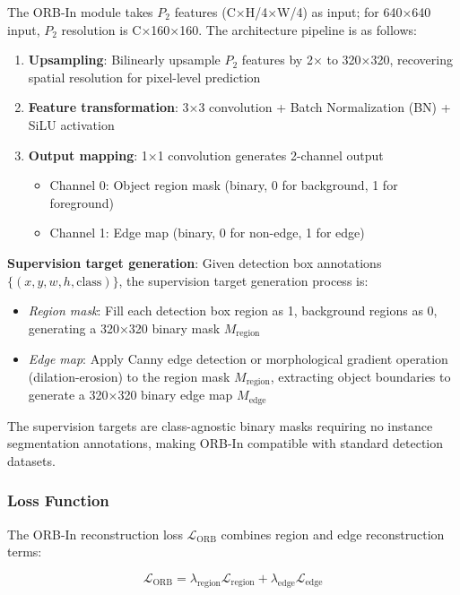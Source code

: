 \documentclass[journal]{IEEEtran}
\begin{document}
The ORB-In module takes $P_2$ features (C×H/4×W/4) as input; for 640×640 input, $P_2$ resolution is C×160×160. The architecture pipeline is as follows:

\begin{enumerate}
    \item \textbf{Upsampling}: Bilinearly upsample $P_2$ features by 2× to 320×320, recovering spatial resolution for pixel-level prediction
    \item \textbf{Feature transformation}: 3×3 convolution + Batch Normalization (BN) + SiLU activation
    \item \textbf{Output mapping}: 1×1 convolution generates 2-channel output
    \begin{itemize}
        \item Channel 0: Object region mask (binary, 0 for background, 1 for foreground)
        \item Channel 1: Edge map (binary, 0 for non-edge, 1 for edge)
    \end{itemize}
\end{enumerate}

\textbf{Supervision target generation}: Given detection box annotations $\{(x, y, w, h, \text{class})\}$, the supervision target generation process is:
\begin{itemize}
    \item \textit{Region mask}: Fill each detection box region as 1, background regions as 0, generating a 320×320 binary mask $M_{\text{region}}$
    \item \textit{Edge map}: Apply Canny edge detection or morphological gradient operation (dilation-erosion) to the region mask $M_{\text{region}}$, extracting object boundaries to generate a 320×320 binary edge map $M_{\text{edge}}$
\end{itemize}

The supervision targets are class-agnostic binary masks requiring no instance segmentation annotations, making ORB-In compatible with standard detection datasets.

\subsubsection{Loss Function}

The ORB-In reconstruction loss $\mathcal{L}_{\text{ORB}}$ combines region and edge reconstruction terms:

\begin{equation}
\mathcal{L}_{\text{ORB}} = \lambda_{\text{region}} \mathcal{L}_{\text{region}} + \lambda_{\text{edge}} \mathcal{L}_{\text{edge}}
\end{equation}
\end{document}
